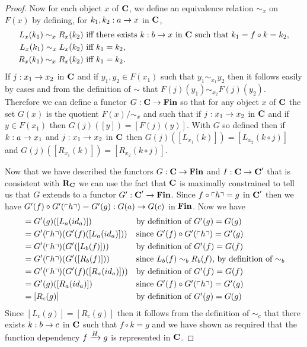 \documentclass[10pt,a4paper]{article}
\theoremstyle{remark}
\begin{document}
\begin{proof}
Now for each object $x$ of $\catc$, we define an equivalence relation $\sim_x$ on $F(x)$ by defining,
for $k_1,k_2:a \morph x$ in $\catc$,
\begin{align*}
L_x(k_1) \sim_x R_x(k_2) & \mbox{ iff there exists $k:b \morph x$ in $\catc$ such that $k_1 = f \circ k = k_2$,}\\
L_x(k_1) \sim_x L_x(k_2) & \mbox{ iff $k_1 = k_2$,} \\
R_x(k_1) \sim_x R_x(k_2) & \mbox{ iff $k_1 = k_2$.} \\
\end{align*}
If $j: x_1 \morph x_2$ in $\catc$ and if $y_1,y_2 \in F(x_1)$ such that $y_1 \sim_{x_1} y_2$
then it follows easily by cases and from the definition of $\sim$ that $F(j)(y_1) \sim_{x_2} F(j)(y_2)$.
Therefore we can define a functor 
 $G: \catc \morph \Fin$  so that for any object $x$ of $\catc$
the set $G(x)$ is the quotient $F(x)/{\sim_x}$ and such that 
if $j: x_1 \morph x_2$ in $\catc$ and if $y \in F(x_1)$ then $G(j)([y])=[F(j)(y)]$.
With $G$ so defined then if $k: a \morph x_1$ and $j:x_1 \morph x_2$ in $\catc$
then  $G(j)([L_{x_1}(k)])=[L_{x_2}(k \circ j)]$ and $G(j)([R_{x_1}(k)])=[R_{x_2}(k \circ j)]$. 

Now that we have described the functors  $G: \catc \morph \Fin$ and $I:\catc \morph \catcp$ that is consistent with $\reqtc$
we can use the fact that $\catc$ is maximally constrained to tell us that $G$ extends to a functor 
$G' : \catcp \morph \Fin$. Since $f \circ \qq{h} = g$ in $\catcp$ then we have
 $G'(f) \circ G'(\qq{h}) = G'(g): G(a) \morph G(c)$ in $\Fin$.
Now we have
\begin{align*}
[L_c(g)]&= G'(g)([L_a(id_a)])              & & \mbox{by definition of $G'(g)=G(g)$}           \\
        &= G'(\qq{h}) (G'(f)([L_a(id_a)])) & & \mbox{since $G'(f) \circ G'(\qq{h}) = G'(g)$}  \\
				&= G'(\qq{h}) (G'([L_b(f)]))       & & \mbox{by definition of $G'(f)=G(f)$}           \\
				&= G'(\qq{h}) (G'([R_b(f)]))       & & \mbox{since $L_b(f) \sim_b R_b(f)$, by definition of $\sim_b$} \\
				&= G'(\qq{h}) (G'(f)([R_a(id_a)])) & & \mbox{by definition of $G'(f)=G(f)$}           \\
		    &= G'(g)([R_a(id_a)])              & & \mbox{since $G'(f) \circ G'(\qq{h}) = G'(g)$}  \\
				&= [R_c(g)]                        & & \mbox{by definition of $G'(g)=G(g)$}           \\
\end{align*} 
Since $[L_c(g)]=[R_c(g)]$ then it follows from the definition of $\sim_c$ that there exists $k:b \morph c$ in 
$\catc$ such that $f \circ k = g$ and we have shown as required that the function dependency
$\fundep{H}{f}{g}$ is represented in $\catc$.

\end{proof}
\end{document}
